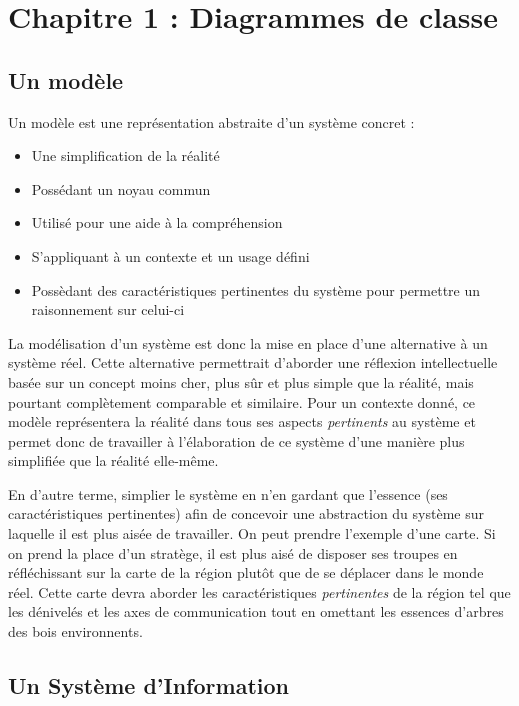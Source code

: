 \documentclass[../Syllabus.tex]{subfiles}
\begin{document}
\section{Chapitre 1 : Diagrammes de classe}

\subsection{Un modèle}

Un modèle est une représentation abstraite d'un système concret :

\begin{itemize}
  \item Une simplification de la réalité
  \item Possédant un noyau commun
  \item Utilisé pour une aide à la compréhension
  \item S'appliquant à un contexte et un usage défini
  \item Possèdant des caractéristiques pertinentes du système pour permettre un raisonnement sur celui-ci
\end{itemize}

La modélisation d'un système est donc la mise en place d'une alternative à un système réel. Cette alternative permettrait d'aborder une réflexion intellectuelle basée sur un concept moins cher, plus sûr et plus simple que la réalité, mais pourtant complètement comparable et similaire. Pour un contexte donné, ce modèle représentera la réalité dans tous ses aspects \textit{pertinents} au système et permet donc de travailler à l'élaboration de ce système d'une manière plus simplifiée que la réalité elle-même.

En d'autre terme, simplier le système en n'en gardant que l'essence (ses caractéristiques pertinentes) afin de concevoir une abstraction du système sur laquelle il est plus aisée de travailler. On peut prendre l'exemple d'une carte. Si on prend la place d'un stratège, il est plus aisé de disposer ses troupes en réfléchissant sur la carte de la région plutôt que de se déplacer dans le monde réel. Cette carte devra aborder les caractéristiques \textit{pertinentes} de la région tel que les dénivelés et les axes de communication tout en omettant les essences d'arbres des bois environnents.

\subsection{Un Système d'Information}
\end{document}
